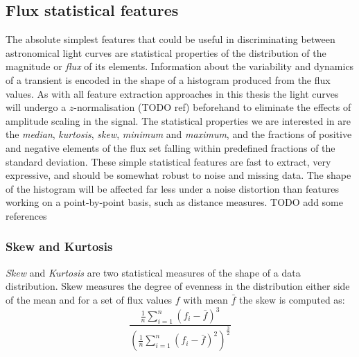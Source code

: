 	

	

	\subsection{Flux statistical features}
	The absolute simplest features that could be useful in discriminating between astronomical light curves are statistical properties of the distribution of the magnitude or \emph{flux} of its elements. Information about the variability and dynamics of a transient is encoded in the shape of a histogram produced from the flux values. As with all feature extraction approaches in this thesis the light curves will undergo a $z$-normalisation (TODO ref) beforehand to eliminate the effects of amplitude scaling in the signal. The statistical properties we are interested in are the \emph{median}, \emph{kurtosis}, \emph{skew}, \emph{minimum} and \emph{maximum}, and the fractions of positive and negative elements of the flux set falling within predefined fractions of the standard deviation. These simple statistical features are fast to extract, very expressive, and should be somewhat robust to noise and missing data. The shape of the histogram will be affected far less under a noise distortion than features working on a point-by-point basis, such as distance measures. TODO add some references
	
	\subsubsection{Skew and Kurtosis}
	\emph{Skew} and \emph{Kurtosis} are two statistical measures of the shape of a data distribution. Skew measures the degree of evenness in the distribution either side of the mean and for a set of flux values $f$ with mean $\bar{f}$ the skew is computed as:
	\begin{equation}
		\frac{\frac{1}{n}\sum\limits^{n}_{i=1}(f_{i} - \bar{f})^{3}}
		{(\frac{1}{n}\sum\limits^{n}_{i=1}(f_{i} - \bar{f})^{2})^{\frac{3}{2}}}
	\end{equation}
	
